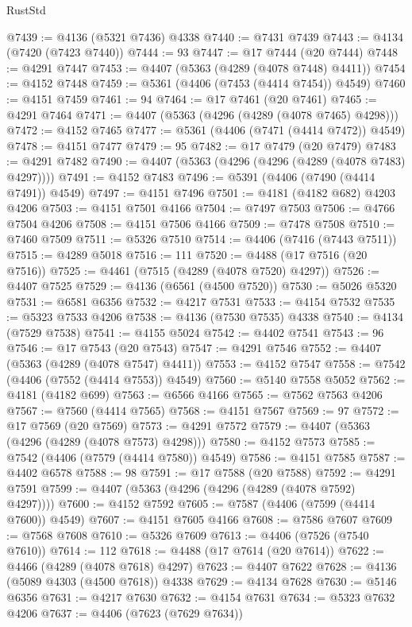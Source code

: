 \begin{lexlean}{RustStd}
\begin{coremodule}
{\begin{coremodule}
{{{{{{{{{{{{{{{{{{{{{{{{{{{{{{{{{{{{{{{{{{{{{{{{{{@7439 := @4136 (@5321 @7436) @4338
@7440 := @7431 @7439
@7443 := @4134 (@7420 (@7423 @7440))
@7444 := 93
@7447 := @17 @7444 (@20 @7444)
@7448 := @4291 @7447
@7453 := @4407 (@5363 (@4289 (@4078 @7448) @4411))
@7454 := @4152 @7448
@7459 := @5361 (@4406 (@7453 (@4414 @7454)) @4549)
@7460 := @4151 @7459
@7461 := 94
@7464 := @17 @7461 (@20 @7461)
@7465 := @4291 @7464
@7471 := @4407 (@5363 (@4296 (@4289 (@4078 @7465) @4298)))
@7472 := @4152 @7465
@7477 := @5361 (@4406 (@7471 (@4414 @7472)) @4549)
@7478 := @4151 @7477
@7479 := 95
@7482 := @17 @7479 (@20 @7479)
@7483 := @4291 @7482
@7490 := @4407 (@5363 (@4296 (@4296 (@4289 (@4078 @7483) @4297))))
@7491 := @4152 @7483
@7496 := @5391 (@4406 (@7490 (@4414 @7491)) @4549)
@7497 := @4151 @7496
@7501 := @4181 (@4182 @682) @4203 @4206
@7503 := @4151 @7501 @4166
@7504 := @7497 @7503
@7506 := @4766 @7504 @4206
@7508 := @4151 @7506 @4166
@7509 := @7478 @7508
@7510 := @7460 @7509
@7511 := @5326 @7510
@7514 := @4406 (@7416 (@7443 @7511))
@7515 := @4289 @5018
@7516 := 111
@7520 := @4488 (@17 @7516 (@20 @7516))
@7525 := @4461 (@7515 (@4289 (@4078 @7520) @4297))
@7526 := @4407 @7525
@7529 := @4136 (@6561 (@4500 @7520))
@7530 := @5026 @5320
@7531 := @6581 @6356
@7532 := @4217 @7531
@7533 := @4154 @7532
@7535 := @5323 @7533 @4206
@7538 := @4136 (@7530 @7535) @4338
@7540 := @4134 (@7529 @7538)
@7541 := @4155 @5024
@7542 := @4402 @7541
@7543 := 96
@7546 := @17 @7543 (@20 @7543)
@7547 := @4291 @7546
@7552 := @4407 (@5363 (@4289 (@4078 @7547) @4411))
@7553 := @4152 @7547
@7558 := @7542 (@4406 (@7552 (@4414 @7553)) @4549)
@7560 := @5140 @7558 @5052
@7562 := @4181 (@4182 @699)
@7563 := @6566 @4166
@7565 := @7562 @7563 @4206
@7567 := @7560 (@4414 @7565)
@7568 := @4151 @7567
@7569 := 97
@7572 := @17 @7569 (@20 @7569)
@7573 := @4291 @7572
@7579 := @4407 (@5363 (@4296 (@4289 (@4078 @7573) @4298)))
@7580 := @4152 @7573
@7585 := @7542 (@4406 (@7579 (@4414 @7580)) @4549)
@7586 := @4151 @7585
@7587 := @4402 @6578
@7588 := 98
@7591 := @17 @7588 (@20 @7588)
@7592 := @4291 @7591
@7599 := @4407 (@5363 (@4296 (@4296 (@4289 (@4078 @7592) @4297))))
@7600 := @4152 @7592
@7605 := @7587 (@4406 (@7599 (@4414 @7600)) @4549)
@7607 := @4151 @7605 @4166
@7608 := @7586 @7607
@7609 := @7568 @7608
@7610 := @5326 @7609
@7613 := @4406 (@7526 (@7540 @7610))
@7614 := 112
@7618 := @4488 (@17 @7614 (@20 @7614))
@7622 := @4466 (@4289 (@4078 @7618) @4297)
@7623 := @4407 @7622
@7628 := @4136 (@5089 @4303 (@4500 @7618)) @4338
@7629 := @4134 @7628
@7630 := @5146 @6356
@7631 := @4217 @7630
@7632 := @4154 @7631
@7634 := @5323 @7632 @4206
@7637 := @4406 (@7623 (@7629 @7634))
}}}}}}}}}}}}}}}}}}}}}}}}}}}}}}}}}}}}}}}}}}}}}}}}}}
\end{coremodule}}
\end{coremodule}
\end{lexlean}
